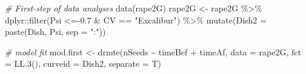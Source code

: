 \documentclass[
]{book}
\newenvironment{Shaded}{\begin{snugshade}}{\end{snugshade}}
\newcommand{\AttributeTok}[1]{\textcolor[rgb]{0.77,0.63,0.00}{#1}}
\newcommand{\CommentTok}[1]{\textcolor[rgb]{0.56,0.35,0.01}{\textit{#1}}}
\newcommand{\FloatTok}[1]{\textcolor[rgb]{0.00,0.00,0.81}{#1}}
\newcommand{\FunctionTok}[1]{\textcolor[rgb]{0.00,0.00,0.00}{#1}}
\newcommand{\NormalTok}[1]{#1}
\newcommand{\OtherTok}[1]{\textcolor[rgb]{0.56,0.35,0.01}{#1}}
\newcommand{\SpecialCharTok}[1]{\textcolor[rgb]{0.00,0.00,0.00}{#1}}
\newcommand{\StringTok}[1]{\textcolor[rgb]{0.31,0.60,0.02}{#1}}
\begin{document}
\begin{Shaded}
\begin{Highlighting}[]
\CommentTok{\# First{-}step of data analyses}
\FunctionTok{data}\NormalTok{(rape2G)}
\NormalTok{rape2G }\OtherTok{\textless{}{-}}\NormalTok{ rape2G }\SpecialCharTok{\%\textgreater{}\%} 
\NormalTok{  dplyr}\SpecialCharTok{::}\FunctionTok{filter}\NormalTok{(Psi }\SpecialCharTok{\textless{}={-}}\FloatTok{0.7} \SpecialCharTok{\&}\NormalTok{ CV }\SpecialCharTok{==} \StringTok{"Excalibur"}\NormalTok{) }\SpecialCharTok{\%\textgreater{}\%} 
  \FunctionTok{mutate}\NormalTok{(}\AttributeTok{Dish2 =} \FunctionTok{paste}\NormalTok{(Dish, Psi, }\AttributeTok{sep =} \StringTok{":"}\NormalTok{))}

\CommentTok{\# model fit}
\NormalTok{mod.first }\OtherTok{\textless{}{-}} \FunctionTok{drmte}\NormalTok{(nSeeds }\SpecialCharTok{\textasciitilde{}}\NormalTok{ timeBef }\SpecialCharTok{+}\NormalTok{ timeAf, }
                   \AttributeTok{data =}\NormalTok{ rape2G,}
                   \AttributeTok{fct =} \FunctionTok{LL.3}\NormalTok{(), }\AttributeTok{curveid =}\NormalTok{ Dish2, }
                   \AttributeTok{separate =}\NormalTok{ T)}


\end{Highlighting}
\end{Shaded}
\end{document}
